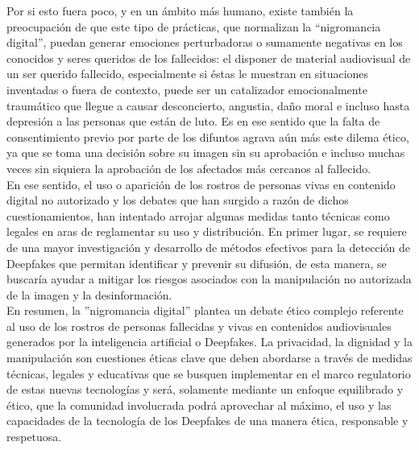 Por si esto fuera poco, y en un ámbito más humano, existe también la preocupación de que este tipo de prácticas, que normalizan la “nigromancia digital”, puedan generar emociones perturbadoras o sumamente negativas en los conocidos y seres queridos de los fallecidos: el disponer de material audiovisual de un ser querido fallecido, especialmente si éstas le muestran en situaciones inventadas o fuera de contexto, puede ser un catalizador emocionalmente traumático que llegue a causar desconcierto, angustia, daño moral e incluso hasta depresión a las personas que están de luto. Es en ese sentido que la falta de consentimiento previo por parte de los difuntos agrava aún más este dilema ético, ya que se toma una decisión sobre su imagen sin su aprobación e incluso muchas veces sin siquiera la aprobación de los afectados más cercanos al fallecido.\\
En ese sentido, el uso o aparición de los rostros de personas vivas en contenido digital no autorizado y los debates que han surgido a razón de dichos cuestionamientos, han intentado arrojar algunas medidas tanto técnicas como legales en aras de reglamentar su uso y distribución. En primer lugar, se requiere de una mayor investigación y desarrollo de métodos efectivos para la detección de Deepfakes que permitan identificar y prevenir su difusión, de esta manera, se buscaría ayudar a mitigar los riesgos asociados con la manipulación no autorizada de la imagen y la desinformación.\\
En resumen, la ”nigromancia digital” plantea un debate ético complejo referente al uso de los rostros de personas fallecidas y vivas en contenidos audiovisuales generados por la inteligencia artificial o Deepfakes. La privacidad, la dignidad y la manipulación son cuestiones éticas clave que deben abordarse a través de medidas técnicas, legales y educativas que se busquen implementar en el marco regulatorio de estas nuevas tecnologías y será, solamente mediante un enfoque equilibrado y ético, que la comunidad involucrada podrá aprovechar al máximo, el uso y las capacidades de la tecnología de los Deepfakes de una manera ética, responsable y respetuosa.
